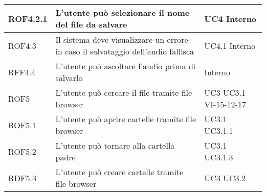 \documentclass[../AnalisideiRequisiti.tex]{subfiles}
\begin{document}
\begin{longtable}{| p{3cm} | p{6cm} | p{3cm} |}
		\hline	
		\newline ROF4.2.1&
		\newline L'utente può selezionare il nome del file da salvare&
		\newline UC4 \newline Interno
		\\[1em]
		
		\hline
		\newline ROF4.3&
		\newline Il sistema deve visualizzare un errore in caso il salvataggio dell'audio fallisca&
		\newline UC4.1 \newline Interno
		\\[1em]
		\hline
		
		\newline RFF4.4&
		\newline L'utente può ascoltare l'audio prima di salvarlo&
		\newline Interno
		\\[1em]
		\hline
		
		\newline ROF5&
		\newline L'utente può cercare il file tramite file browser&
		\newline UC3 \newline UC3.1 \newline VI-15-12-17
		\\[1em]
		\hline
		
			\newline ROF5.1&
		\newline L'utente può aprire cartelle tramite file browser&
		\newline UC3.1 \newline UC3.1.1
		\\[1em]
		\hline
		
		\newline ROF5.2&
		\newline L'utente può tornare alla cartella padre&
		\newline UC3.1 \newline UC3.1.3
		\\[1em]
		\hline
		
		\newline RDF5.3&
		\newline L'utente può creare cartelle tramite file browser&
		\newline UC3 \newline UC3.2
		\\[1em]
		\hline
		

\end{longtable}
\end{document}
